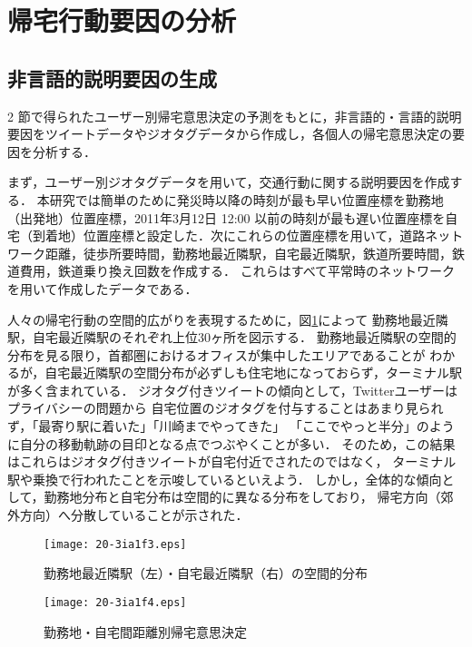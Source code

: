 \documentclass[japanese]{jnlp_1.4}
\begin{document}
\section{帰宅行動要因の分析}

\subsection{非言語的説明要因の生成}

2 節で得られたユーザー別帰宅意思決定の予測をもとに，非言語的・言語的説明要因をツイートデータやジオタグデータから作成し，各個人の帰宅意思決定の要因を分析する．

まず，ユーザー別ジオタグデータを用いて，交通行動に関する説明要因を作成する．
本研究では簡単のために発災時以降の時刻が最も早い位置座標を勤務地（出発地）位置座標，2011年3月12日 12:00 以前の時刻が最も遅い位置座標を自宅（到着地）位置座標と設定した．次にこれらの位置座標を用いて，道路ネットワーク距離，徒歩所要時間，勤務地最近隣駅，自宅最近隣駅，鉄道所要時間，鉄道費用，鉄道乗り換え回数を作成する．
これらはすべて平常時のネットワークを用いて作成したデータである．

人々の帰宅行動の空間的広がりを表現するために，図\ref{fig:locationmap}によって
勤務地最近隣駅，自宅最近隣駅のそれぞれ上位30ヶ所を図示する．
勤務地最近隣駅の空間的分布を見る限り，首都圏におけるオフィスが集中したエリアであることが
わかるが，自宅最近隣駅の空間分布が必ずしも住宅地になっておらず，ターミナル駅が多く含まれている．
ジオタグ付きツイートの傾向として，Twitterユーザーはプライバシーの問題から
自宅位置のジオタグを付与することはあまり見られず，「最寄り駅に着いた」「川崎までやってきた」
「ここでやっと半分」のように自分の移動軌跡の目印となる点でつぶやくことが多い．
そのため，この結果はこれらはジオタグ付きツイートが自宅付近でされたのではなく，
ターミナル駅や乗換で行われたことを示唆しているといえよう．
しかし，全体的な傾向として，勤務地分布と自宅分布は空間的に異なる分布をしており，
帰宅方向（郊外方向）へ分散していることが示された．

\begin{figure}[b]
\begin{center}
\texttt{[image: 20-3ia1f3.eps]}
\end{center}
\caption{勤務地最近隣駅（左）・自宅最近隣駅（右）の空間的分布}
\label{fig:locationmap}
\end{figure}
\begin{figure}[b]
\begin{center}
\texttt{[image: 20-3ia1f4.eps]}
\end{center}
\caption{勤務地・自宅間距離別帰宅意思決定}
\label{fig:distance_cross}
\end{figure}
\end{document}
